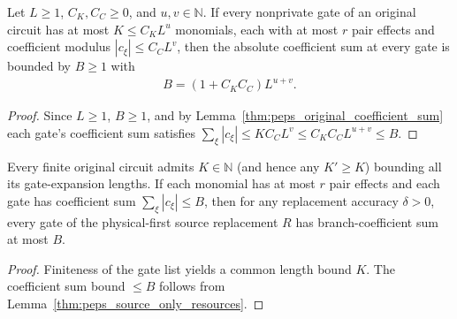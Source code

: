 \begin{lemma}
    \label{thm:peps_original_coefficient_majorant}
    \leanok
    Let $L\geq1$, $C_K,C_C\geq0$, and $u,v\in\mathbb N$. If every nonprivate gate
    of an original circuit has at most $K\leq C_KL^u$ monomials, each with at
    most $r$ pair effects and coefficient modulus $|c_\xi|\le C_CL^v$, then the
    absolute coefficient sum at every gate is bounded by $B\ge 1$ with
    \begin{align}
        B=(1+C_KC_C)L^{u+v}.
        \label{eq:peps_original_coefficient_majorant}
    \end{align}
\end{lemma}
\begin{proof}
    \leanok
    Since $L\ge 1$, $B\ge 1$, and by Lemma~\ref{thm:peps_original_coefficient_sum}
    each gate's coefficient sum satisfies
    $\sum_\xi|c_\xi|\le K C_CL^v\le C_KC_CL^{u+v}\le B$.
\end{proof}

\begin{lemma}
    \label{thm:peps_original_finite_expansion_bound}
    \leanok
    Every finite original circuit admits $K\in\mathbb N$ (and hence any
    $K'\ge K$) bounding all its gate-expansion lengths. If each monomial has at
    most $r$ pair effects and each gate has coefficient sum $\sum_\xi|c_\xi|\le B$,
    then for any replacement accuracy $\delta>0$, every gate of the physical-first
    source replacement $R$ has branch-coefficient sum at most $B$.
\end{lemma}
\begin{proof}
    \leanok
    Finiteness of the gate list yields a common length bound $K$.
    The coefficient sum bound $\le B$ follows from
    Lemma~\ref{thm:peps_source_only_resources}.
\end{proof}


